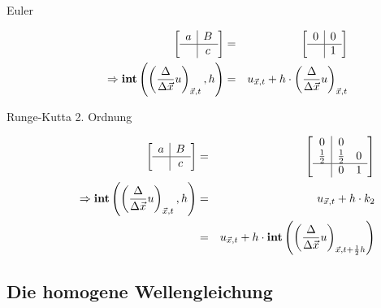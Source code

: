 \documentclass[11pt]{scrreprt} %
\theoremstyle{definition}
\begin{document}
\begin{description}
\item[Euler]
\begin{eqnarray*}
\begin{bmatrix}
\begin{array}{c|c}
a & B\\
\hline     & c \\
\end{array}
\end{bmatrix}
 &=& \begin{bmatrix}
\begin{array}{c|c}
0 & 0 \\\hline
& 1
\end{array}
\end{bmatrix} \\
\Rightarrow \mathbf{int}\left(\left(\frac{\Delta}{\Delta \vec x}u \right)_{\vec x, t}, h\right) &=& u_{\vec x, t} + h\cdot \left(\frac{\Delta}{\Delta \vec x}u \right)_{\vec x, t}
\end{eqnarray*}

\item[Runge-Kutta 2. Ordnung]
\begin{eqnarray*}
\begin{bmatrix}
\begin{array}{c|c}
a & B\\
\hline     & c \\
\end{array}
\end{bmatrix} &=& \begin{bmatrix}
\begin{array}{c|cc}
0 & 0 \\
\frac 1 2 & \frac 1 2 & 0 \\\hline
& 0 & 1
\end{array}
\end{bmatrix} \\
\Rightarrow \mathbf{int}\left(\left(\frac{\Delta}{\Delta \vec x}u \right)_{\vec x, t}, h\right) &=& u_{\vec x, t} + h\cdot k_2 \\
&=&  u_{\vec x, t} + h\cdot\mathbf{int}\left(\left(\frac{\Delta}{\Delta \vec x}u \right)_{\vec x, t + \frac 1 2 h} \right) \\
\end{eqnarray*}

\end{description}

\subsection{Die homogene Wellengleichung}
\end{document}

